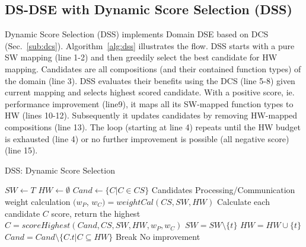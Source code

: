 \subsection{DS-DSE with Dynamic Score Selection (DSS)}
\label{sub:dss}

Dynamic Score Selection (DSS) implements Domain DSE based on DCS (Sec.~\ref{sub:dcs}). Algorithm~\ref{alg:dss} illustrates the flow. DSS starts with a pure SW mapping (line 1-2) and then greedily select the best candidate for HW mapping. Candidates are all compositions (and their contained function types) of the domain (line 3). DSS evaluates their benefits using the DCS (line 5-8) given current mapping and selects highest scored candidate. With a positive score, ie. performance improvement (line9), it maps all its SW-mapped function types to HW (lines 10-12). Subsequently it updates candidates by removing HW-mapped compositions (line 13). The loop (starting at line 4) repeats until the HW budget is exhausted (line 4) or no further improvement is possible (all negative score) (line 15).

\begin{algorithm}
\caption{DSS: Dynamic Score Selection}
\label{alg:dss}
\begin{algorithmic}[1]
{\footnotesize
\State $SW \gets T$
\State $HW \gets \emptyset$
\State $Cand \gets \{C \vert C \in CS\}$
\Comment Candidates
	\LineComment Processing/Communication weight calculation
	\State $(w_{P}$, $w_{C}) = weightCal(CS, SW, HW)$
	\LineComment Calculate each candidate $C$ score, return the highest
	\State $C = scoreHighest(Cand, CS, SW, HW, w_{P}, w_{C})$
			\State $SW = SW \setminus \{t\}$
			\State $HW = HW \cup \{t\}$
		\EndFor
		\State $Cand = Cand \setminus \{C.t \vert C \subseteq HW \}$
	\Else
		\State Break \Comment No improvement
	\EndIf
\EndWhile
}
\end{algorithmic}
\end{algorithm}
